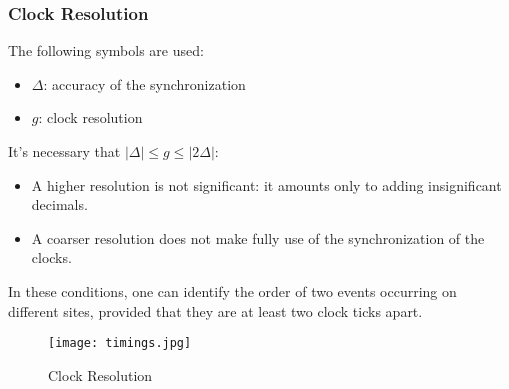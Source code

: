 \documentclass[../main.tex]{subfiles}
\begin{document}
\subsubsection{Clock Resolution}
The following symbols are used:
\begin{itemize}
	\item $\Delta$: accuracy of the synchronization
	\item $g$: clock resolution
\end{itemize}
It's necessary that $| \Delta | \leq g \leq | 2 \Delta |$:
\begin{itemize}
	\item A higher resolution is not significant: it amounts only to adding insignificant decimals.
	\item A coarser resolution does not make fully use of the synchronization of the clocks.
\end{itemize}
In these conditions, one can identify the order of two events occurring on different sites, provided that they are at least two clock ticks apart.

\begin{figure}[H]
    \centering
    \texttt{[image: timings.jpg]}
    \caption{Clock Resolution}
    \label{clockres}
\end{figure}
\end{document}
